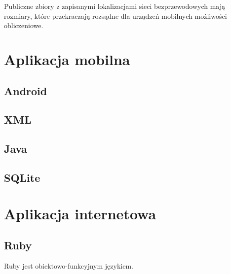 

 Publiczne zbiory z zapisanymi lokalizacjami sieci bezprzewodowych mają rozmiary, które przekraczają rozsądne dla urządzeń mobilnych możliwości obliczeniowe.

\section{Aplikacja mobilna}
\subsection{Android}
\subsection{XML}
\subsection{Java}
\subsection{SQLite}

\section{Aplikacja internetowa}

\subsection{Ruby}
Ruby jest obiektowo-funkcyjnym językiem.


